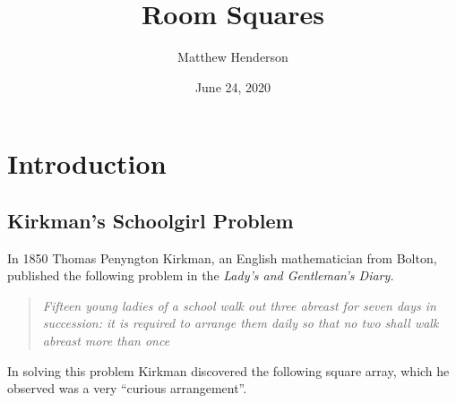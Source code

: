 \documentclass[
  12pt,
  a4paper]{book}
\title{Room Squares}
\author{Matthew Henderson}
\date{June 24, 2020}
\begin{document}
\maketitle

{
\setcounter{tocdepth}{1}
\tableofcontents
}
\hypertarget{introduction}{%
\chapter{Introduction}\label{introduction}}

\hypertarget{kirkmans-schoolgirl-problem}{%
\section{Kirkman's Schoolgirl Problem}\label{kirkmans-schoolgirl-problem}}

In 1850 Thomas Penyngton Kirkman, an English mathematician from Bolton,
published the following problem in the \emph{Lady's and Gentleman's Diary.}

\begin{quote}
\emph{Fifteen young ladies of a school walk out three abreast for seven
days in succession: it is required to arrange them daily so that no
two shall walk abreast more than once}
\end{quote}

In solving this problem Kirkman discovered the following square array,
which he observed was a very ``curious arrangement''.
\end{document}

